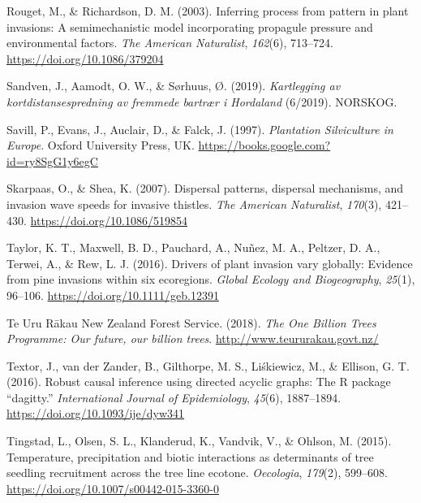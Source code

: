 \documentclass[
]{article}
\newlength{\cslhangindent}
\newenvironment{CSLReferences}[2] %
 {\begin{list}{}{%
  \setlength{\itemindent}{0pt}
  \setlength{\leftmargin}{0pt}
  \setlength{\parsep}{0pt}
  \ifodd #1
   \setlength{\leftmargin}{\cslhangindent}
   \setlength{\itemindent}{-1\cslhangindent}
  \fi
  \setlength{\itemsep}{#2\baselineskip}}}
 {\end{list}}
\begin{document}
\begin{CSLReferences}{1}{0}
Rouget, M., \& Richardson, D. M. (2003). Inferring process from pattern in plant invasions: A semimechanistic model incorporating propagule pressure and environmental factors. \emph{The American Naturalist}, \emph{162}(6), 713--724. \url{https://doi.org/10.1086/379204}

Sandven, J., Aamodt, O. W., \& Sørhuus, Ø. (2019). \emph{Kartlegging av kortdistansespredning av fremmede bartrær i {Hordaland}} (6/2019). {NORSKOG}.

Savill, P., Evans, J., Auclair, D., \& Falck, J. (1997). \emph{Plantation {Silviculture} in {Europe}}. {Oxford University Press, UK}. \url{https://books.google.com?id=ry8SgG1y6egC}

Skarpaas, O., \& Shea, K. (2007). Dispersal patterns, dispersal mechanisms, and invasion wave speeds for invasive thistles. \emph{The American Naturalist}, \emph{170}(3), 421--430. \url{https://doi.org/10.1086/519854}

Taylor, K. T., Maxwell, B. D., Pauchard, A., Nuñez, M. A., Peltzer, D. A., Terwei, A., \& Rew, L. J. (2016). Drivers of plant invasion vary globally: Evidence from pine invasions within six ecoregions. \emph{Global Ecology and Biogeography}, \emph{25}(1), 96--106. \url{https://doi.org/10.1111/geb.12391}

Te Uru Rākau New Zealand Forest Service. (2018). \emph{The {One Billion Trees Programme}: Our future, our billion trees}. \url{http://www.teururakau.govt.nz/}

Textor, J., van der Zander, B., Gilthorpe, M. S., Liśkiewicz, M., \& Ellison, G. T. (2016). Robust causal inference using directed acyclic graphs: The {R} package {``dagitty.''} \emph{International Journal of Epidemiology}, \emph{45}(6), 1887--1894. \url{https://doi.org/10.1093/ije/dyw341}

Tingstad, L., Olsen, S. L., Klanderud, K., Vandvik, V., \& Ohlson, M. (2015). Temperature, precipitation and biotic interactions as determinants of tree seedling recruitment across the tree line ecotone. \emph{Oecologia}, \emph{179}(2), 599--608. \url{https://doi.org/10.1007/s00442-015-3360-0}


\end{CSLReferences}
\end{document}
